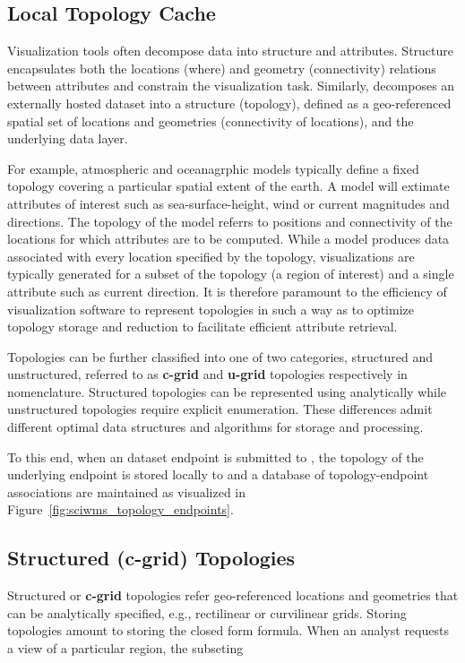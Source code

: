 \subsection{Local Topology Cache}
Visualization tools often decompose data into structure and
attributes.  Structure encapsulates both the locations (where) and
geometry (connectivity) relations between attributes and constrain the
visualization task. Similarly, \sciwms{} decomposes an externally
hosted dataset into a structure (topology), defined as a
geo-referenced spatial set of locations and geometries (connectivity
of locations), and the underlying data layer. 

For example, atmospheric and oceanagrphic models typically define a
fixed topology covering a particular spatial extent of the earth. A
model will extimate attributes of interest such as sea-surface-height,
wind or current magnitudes and directions. The topology of the model
referrs to positions and connectivity of the locations for which
attributes are to be computed. While a model produces data associated
with every location specified by the topology, visualizations are
typically generated for a subset of the topology (a region of
interest) and a single attribute such as current direction. It is
therefore paramount to the efficiency of visualization software to
represent topologies in such a way as to optimize topology storage and
reduction to facilitate efficient attribute retrieval. 

Topologies can be further classified into one of two categories,
structured and unstructured, referred to as {\bf c-grid} and {\bf
  u-grid} topologies respectively in \sciwms{}
nomenclature. Structured topologies can be represented using
analytically while unstructured topologies require explicit
enumeration. These differences admit different optimal data structures
and algorithms for storage and processing.

To this end, when an dataset endpoint is submitted to \sciwms{}, the
topology of the underlying endpoint is stored locally to \sciwms{} and
a database of topology-endpoint associations are maintained as
visualized in Figure~\ref{fig:sciwms_topology_endpoints}. 

\subsection{Structured (c-grid) Topologies}
Structured or {\bf c-grid} topologies refer geo-referenced locations
and geometries that can be analytically specified, e.g., rectilinear
or curvilinear grids. Storing \cgrid{} topologies amount to storing
the closed form formula. When an analyst requests a view of a
particular region, the subseting
